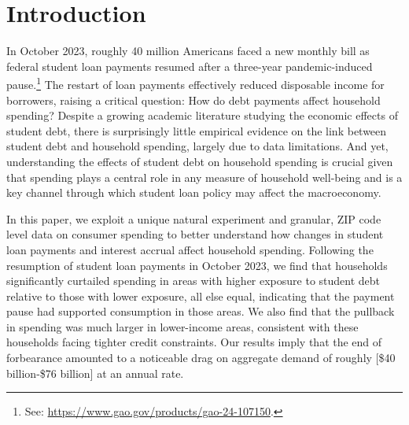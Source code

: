 \documentclass[12pt]{article}
\begin{document}
\clearpage
\egroup
\setcounter{page}{1}


\section{Introduction \label{sec:intro}}

In October 2023, roughly 40 million Americans faced a new monthly bill as federal student loan payments resumed after a three-year pandemic-induced pause.\footnote{See: \url{https://www.gao.gov/products/gao-24-107150}.} The restart of loan payments effectively reduced disposable income for borrowers, raising a critical question: How do debt payments affect household spending? Despite a growing academic literature studying the economic effects of student debt, there is surprisingly little empirical evidence on the link between student debt and household spending, largely due to data limitations. And yet, understanding the effects of student debt on household spending is crucial given that spending plays a central role in any measure of household well-being and is a key channel through which student loan policy may affect the macroeconomy. 

In this paper, we exploit a unique natural experiment and granular, ZIP code level data on consumer spending to better understand how changes in student loan payments and interest accrual affect household spending. Following the resumption of student loan payments in October 2023, we find that households significantly curtailed spending in areas with higher exposure to student debt relative to those with lower exposure, all else equal, indicating that the payment pause had supported consumption in those areas. We also find that the pullback in spending was much larger in lower-income areas, consistent with these households facing tighter credit constraints. Our results imply that the end of forbearance amounted to a noticeable drag on aggregate demand of roughly [\$40 billion-\$76 billion] at an annual rate.
\end{document}
